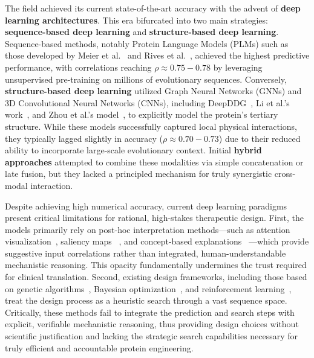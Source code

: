 \documentclass[11pt]{article}
\begin{document}
The field achieved its current state-of-the-art accuracy with the advent of
\textbf{deep learning architectures}. This era bifurcated into two main
strategies: \textbf{sequence-based deep learning} and \textbf{structure-based
deep learning}. Sequence-based methods, notably Protein Language Models (PLMs)
such as those developed by Meier et al.~\cite{meier2021language} and Rives et
al.~\cite{rives2021biological}, achieved the highest predictive performance,
with correlations reaching $\rho \approx 0.75-0.78$ by leveraging unsupervised
pre-training on millions of evolutionary sequences. Conversely,
\textbf{structure-based deep learning} utilized Graph Neural Networks (GNNs)
and 3D Convolutional Neural Networks (CNNs), including 
DeepDDG~\cite{cao2019deepddg}, Li et al.'s work~\cite{li2020predicting}, and Zhou et
al.'s model~\cite{zhou2020mutation}, to explicitly model the protein's
tertiary structure. While these models successfully captured local physical
interactions, they typically lagged slightly in accuracy ($\rho \approx
0.70-0.73$) due to their reduced ability to incorporate large-scale
evolutionary context. Initial \textbf{hybrid approaches} attempted to combine
these modalities via simple concatenation or late fusion, but they lacked a
principled mechanism for truly synergistic cross-modal interaction.

Despite achieving high numerical accuracy, current deep learning paradigms
present critical limitations for rational, high-stakes therapeutic design.
First, the models primarily rely on post-hoc interpretation methods—such as
attention visualization~\cite{vig2021bertology}, saliency maps
~\cite{sundararajan2017axiomatic}, and concept-based explanations
~\cite{kim2018interpretability}—which provide suggestive input correlations
rather than integrated, human-understandable mechanistic reasoning. This
opacity fundamentally undermines the trust required for clinical translation.
Second, existing design frameworks, including those based on genetic 
algorithms~\cite{romero2009exploring}, Bayesian optimization~\cite{laine2021protein},
and reinforcement learning~\cite{angermueller2019model}, treat the design
process as a heuristic search through a vast sequence space. Critically, these
methods fail to integrate the prediction and search steps with explicit,
verifiable mechanistic reasoning, thus providing design choices without
scientific justification and lacking the strategic search capabilities
necessary for truly efficient and accountable protein engineering.
\end{document}
